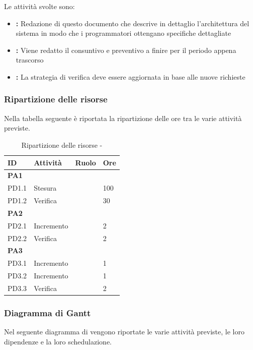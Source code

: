\documentclass[12pt,a4paper]{article}
\begin{document}
Le attività svolte sono:

\begin{itemize}
	\item \textbf{\DP{}:}
        Redazione di questo documento che descrive in dettaglio l'architettura del 
        sistema in modo che i programmatori ottengano specifiche dettagliate
	\item \textbf{\PdP{}:} Viene redatto il consuntivo e preventivo a finire per il periodo appena trascorso
	\item \textbf{\PdQ{}:} La strategia di verifica deve essere aggiornata in base alle nuove richieste
\end{itemize}

\subsubsection{Ripartizione delle risorse}
Nella tabella seguente è riportata la ripartizione delle ore tra le varie attività previste.

\begin{table}[H]
	\begin{center}
		\begin{tabular}{p{} p{} p{} p{}}
			\toprule
			\textbf{ID}	& \textbf{Attività}	& \textbf{Ruolo} & \textbf{Ore}\\ \midrule
			\midrule
			\textbf{PA1} & \textbf{\DP{}} & &  \\ \midrule
			PD1.1 & Stesura & \PG{} & 100 \\ \midrule
			PD1.2 & Verifica & \VR{} & 30 \\ \midrule
			\textbf{PA2} & \textbf{\PdP{}} & &  \\ \midrule
			PD2.1 & Incremento & \RE{} & 2 \\ \midrule
			PD2.2 & Verifica & \VR{} & 2 \\ \midrule
			\textbf{PA3} & \textbf{\PdQ{}} & &  \\ \midrule
			PD3.1 & Incremento & \RE{} & 1 \\ \midrule
			PD3.2 & Incremento & \RE{} & 1 \\ \midrule
			PD3.3 & Verifica & \VR{} & 2 \\ \midrule
			\bottomrule
		\end{tabular}
		\caption{Ripartizione delle risorse - \FPD{}}
	\end{center}
\end{table}

\newpage
\subsubsection{Diagramma di Gantt}
\label{gantt progettazione di dettaglio}
Nel seguente diagramma di  vengono riportate le varie attività previste, le loro dipendenze e la loro schedulazione.
\end{document}
